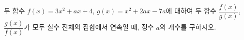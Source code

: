 두 함수 $f(x)=3x^2+ax+4$, $g(x)=x^2+2ax-7a$에 대하여 두 함수 $\dfrac{f(x)}{g(x)}$, $\dfrac{g(x)}{f(x)}$가 모두 실수 전체의 집합에서 연속일 때, 정수 $a$의 개수를 구하시오.
